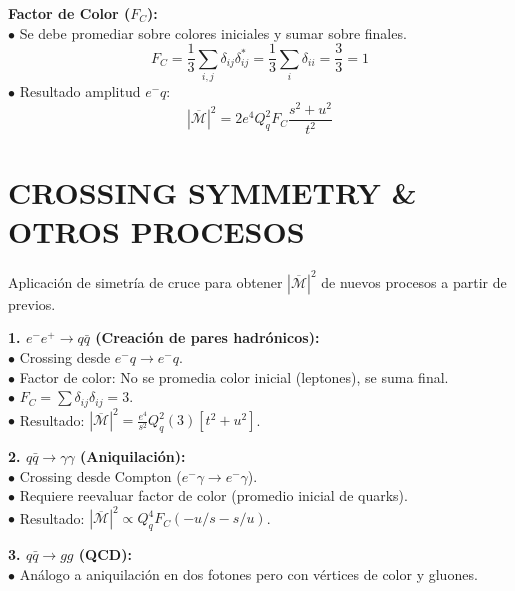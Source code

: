 \textbf{Factor de Color ($F_C$):}\\
$\bullet$ Se debe promediar sobre colores iniciales y sumar sobre finales.
$$ F_C = \frac{1}{3} \sum_{i,j} \delta_{ij} \delta_{ij}^* = \frac{1}{3} \sum_i \delta_{ii} = \frac{3}{3} = 1 $$
$\bullet$ Resultado amplitud $e^- q$:
$$ |\overline{\mathcal{M}}|^2 = 2e^4 Q_q^2 F_C \frac{s^2+u^2}{t^2} $$

\section{CROSSING SYMMETRY \& OTROS PROCESOS}
Aplicación de simetría de cruce para obtener $|\overline{\mathcal{M}}|^2$ de nuevos procesos a partir de previos.

\textbf{1. $e^- e^+ \to q \bar{q}$ (Creación de pares hadrónicos):}\\
$\bullet$ Crossing desde $e^- q \to e^- q$.\\
$\bullet$ Factor de color: No se promedia color inicial (leptones), se suma final.\\
$\bullet$ $F_C = \sum \delta_{ij}\delta_{ij} = 3$.\\
$\bullet$ Resultado: $|\overline{\mathcal{M}}|^2 = \frac{e^4}{s^2} Q_q^2 (3) [t^2+u^2]$.

\textbf{2. $q \bar{q} \to \gamma \gamma$ (Aniquilación):}\\
$\bullet$ Crossing desde Compton ($e^- \gamma \to e^- \gamma$).\\
$\bullet$ Requiere reevaluar factor de color (promedio inicial de quarks).\\
$\bullet$ Resultado: $|\overline{\mathcal{M}}|^2 \propto Q_q^4 F_C (-u/s - s/u)$.

\textbf{3. $q \bar{q} \to g g$ (QCD):}\\
$\bullet$ Análogo a aniquilación en dos fotones pero con vértices de color y gluones.

